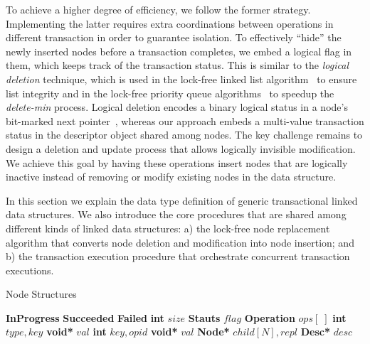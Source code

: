 \documentclass[10pt,conference,compsocconf]{IEEEtran}
\begin{document}
To achieve a higher degree of efficiency, we follow the former strategy.
Implementing the latter requires extra coordinations between operations in different transaction in order to guarantee isolation.
To effectively ``hide'' the newly inserted nodes before a transaction completes, we embed a logical flag in them, which keeps track of the transaction status. 
This is similar to the \emph{logical deletion} technique, which is used in the lock-free linked list algorithm~\cite{harris2001pragmatic} to ensure list integrity and in the lock-free priority queue algorithms~\cite{linden2013skiplist,zhang2015lockfree} to speedup the \emph{delete-min} process.
Logical deletion encodes a binary logical status in a node's bit-marked next pointer~\cite{harris2001pragmatic}, whereas our approach embeds a multi-value transaction status in the descriptor object shared among nodes.
The key challenge remains to design a deletion and update process that allows logically invisible modification.
We achieve this goal by having these operations insert nodes that are logically inactive instead of removing or modify existing nodes in the data structure.

In this section we explain the data type definition of generic transactional linked data structures. 
We also introduce the core procedures that are shared among different kinds of linked data structures: a) the lock-free node replacement algorithm that converts node deletion and modification into node insertion; and b) the transaction execution procedure that orchestrate concurrent transaction executions.

\begin{algorithm}[h]
    \caption{Node Structures}
    \label{alg:nodestructure}
    \vspace{-0.2in}
    \begin{multicols}{2}
        \begin{algorithmic}[1]
            \State \textbf{InProgress}
            \State \textbf{Succeeded}
            \State \textbf{Failed}
            \EndEnum
            \State \textbf{int} $size$
            \State \textbf{Stauts} $flag$
            \State \textbf{Operation} $ops[\;]$
            \EndStruct
            \State \textbf{int} $type,key$
            \State \textbf{void*} $val$
            \EndStruct
            \State \textbf{int} $key,opid$
            \State \textbf{void*} $val$
            \State \textbf{Node*} $child[N],repl$
            \State \textbf{Desc*} $desc$
            \EndStruct
            \end{algorithmic}
    \end{multicols}
    \vspace{-0.15in}
\end{algorithm}
\end{document}
